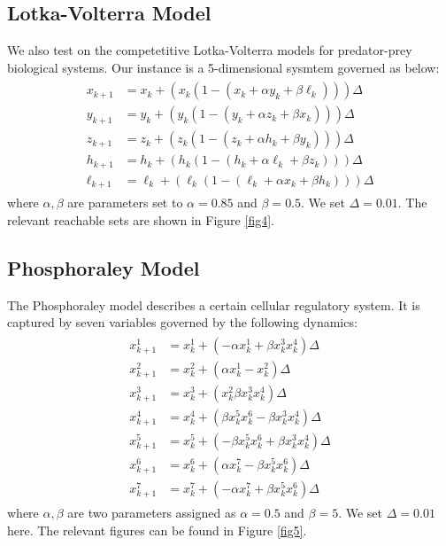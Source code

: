 \documentclass[EPiC]{easychair}
\begin{document}

\subsection{Lotka-Volterra Model}
\noindent We also test on the competetitive Lotka-Volterra models for predator-prey biological systems. Our instance is a 5-dimensional sysmtem governed as below:
\begin{align}
    \begin{split}
        x_{k+1} &= x_k + (x_k(1 - (x_k + \alpha y_k + \beta \ell_k))) \Delta \\
        y_{k+1} &= y_k + (y_k(1 - (y_k + \alpha z_k + \beta x_k))) \Delta \\
        z_{k+1} &= z_k + (z_k(1 - (z_k + \alpha h_k + \beta y_k))) \Delta \\
        h_{k+1} &= h_k + (h_k(1 - (h_k + \alpha \ell_k + \beta z_k))) \Delta \\
        \ell_{k+1} &= \ell_k + (\ell_k(1 - (\ell_k + \alpha x_k + \beta h_k))) \Delta
    \end{split}
\end{align}
where $\alpha,\beta$ are parameters set to $\alpha=0.85$ and $\beta=0.5$. We set $\Delta = 0.01$.
The relevant reachable sets are shown in Figure \ref{fig4}.

\subsection{Phosphoraley Model}
The Phosphoraley model describes a certain cellular regulatory system. It is captured by seven variables governed by the following dynamics:
\begin{align}
    \begin{split}
        x^1_{k+1} &= x^1_k + ( -\alpha x^1_k + \beta x^3_k x^4_k)\Delta \\
        x^2_{k+1} &= x^2_k + (  \alpha x^1_k - x^2_k)\Delta \\
        x^3_{k+1} &= x^3_k + ( x^2_k \beta x^3_k x^4_k)\Delta \\
        x^4_{k+1} &= x^4_k + ( \beta x^5_k x^6_k - \beta x^3_k x^4_k)\Delta \\
        x^5_{k+1} &= x^5_k + ( -\beta x^5_k x^6_k + \beta x^3_k x^4_k)\Delta \\
        x^6_{k+1} &= x^6_k + ( \alpha x^7_k - \beta x^5_k x^6_k)\Delta \\
        x^7_{k+1} &= x^7_k + ( -\alpha x^7_k + \beta x^5_k x^6_k)\Delta
    \end{split}
\end{align}
where $\alpha,\beta$ are two parameters assigned as $\alpha=0.5$ and $\beta=5$. We set $\Delta =0.01$ here. The relevant figures can be found in Figure \ref{fig5}.
\end{document}
